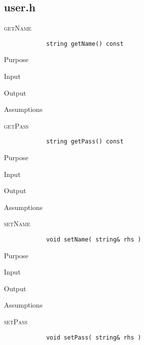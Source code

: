 \documentclass[pdftex, 12pt]{article}
\begin{document}
\subsection{user.h}
\begin{description}
	\item{\textsc{getName}}
		\begin{lstlisting}
			string getName() const
		\end{lstlisting}
		\begin{description}

			\item{Purpose}

			\item{Input}

			\item{Output}

			\item{Assumptions}

		\end{description}
	\item{\textsc{getPass}}
		\begin{lstlisting}
			string getPass() const
		\end{lstlisting}
		\begin{description}

			\item{Purpose}

			\item{Input}

			\item{Output}

			\item{Assumptions}

		\end{description}
	\item{\textsc{setName}}
		\begin{lstlisting}
			void setName( string& rhs )
		\end{lstlisting}
		\begin{description}

			\item{Purpose}

			\item{Input}

			\item{Output}

			\item{Assumptions}

		\end{description}
	\item{\textsc{setPass}}
		\begin{lstlisting}
			void setPass( string& rhs )
		\end{lstlisting}
		\begin{description}


\end{description}
\end{description}
\end{document}
